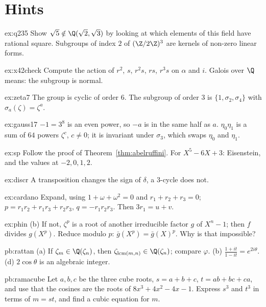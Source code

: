 \section{Hints}

\begin{hint}{ex:q235}
Show $\sqrt5\notin\Q(\sqrt2,\sqrt3)$ by looking at which elements of this field have rational square. Subgroups of index $2$ of $(\Z/2\Z)^3$ are kernels of non-zero linear forms.
\end{hint}
\begin{hint}{ex:x42check}
Compute the action of $r^2$, $s$, $r^2s$, $rs$, $r^3s$ on $\alpha$ and $i$. Galois over $\Q$ means: the subgroup is normal.
\end{hint}
\begin{hint}{ex:zeta7}
The group is cyclic of order $6$. The subgroup of order $3$ is $\{1,\sigma_2,\sigma_4\}$ with $\sigma_a(\zeta)=\zeta^a$.
\end{hint}
\begin{hint}{ex:gauss17}
$-1=3^8$ is an even power, so $-a$ is in the same half as $a$. $\eta_0\eta_1$ is a sum of $64$ powers $\zeta^c$, $c\ne0$; it is invariant under $\sigma_3$, which swaps $\eta_0$ and $\eta_1$.
\end{hint}
\begin{hint}{ex:sp}
Follow the proof of Theorem~\ref{thm:abelruffini}. For $X^5-6X+3$: Eisenstein, and the values at $-2,0,1,2$.
\end{hint}
\begin{hint}{ex:discr}
A transposition changes the sign of $\delta$, a $3$-cycle does not.
\end{hint}
\begin{hint}{ex:cardano}
Expand, using $1+\omega+\omega^2=0$ and $r_1+r_2+r_3=0$; $p=r_1r_2+r_1r_3+r_2r_3$, $q=-r_1r_2r_3$. Then $3r_1=u+v$.
\end{hint}
\begin{hint}{ex:phin}
(b) If not, $\zeta^p$ is a root of another irreducible factor $g$ of $X^n-1$; then $f$ divides $g(X^p)$. Reduce modulo $p$: $\bar g(X^p)=\bar g(X)^p$. Why is that impossible?
\end{hint}

\begin{hint}{pb:rattan}
(a) If $\zeta_m\in\Q(\zeta_n)$, then $\zeta_{\operatorname{lcm}(m,n)}\in\Q(\zeta_n)$; compare $\varphi$. (b)
$\frac{1+it}{1-it}=e^{2i\theta}$. (d) $2\cos\theta$ is an algebraic integer.
\end{hint}

\begin{hint}{pb:ramacube}
Let $a,b,c$ be the three cube roots, $s=a+b+c$, $t=ab+bc+ca$, and use that the cosines are the roots of
$8x^3+4x^2-4x-1$. Express $s^3$ and $t^3$ in terms of $m=st$, and find a cubic equation for $m$.
\end{hint}

